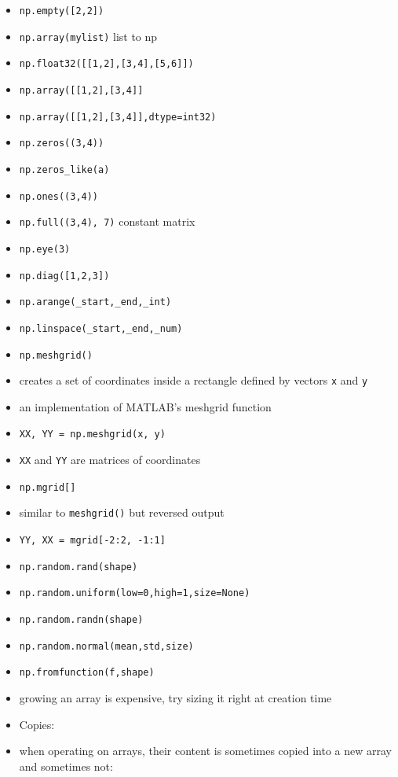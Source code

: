 \documentclass[onecolumn]{IEEEtran} %
\begin{document}
\begin{itemize}
    \bi
        \item \verb|np.empty([2,2])|
        \item \verb|np.array(mylist)| list to np
        \item \verb|np.float32([[1,2],[3,4],[5,6]])|
        \item \verb|np.array([[1,2],[3,4]]|
        \item \verb|np.array([[1,2],[3,4]],dtype=int32)|
        \item \verb|np.zeros((3,4))|
        \item \verb|np.zeros_like(a)|
        \item \verb|np.ones((3,4))|
        \item \verb|np.full((3,4), 7)| constant matrix
        \item \verb|np.eye(3)|
        \item \verb|np.diag([1,2,3])|
        \item \verb|np.arange(_start,_end,_int)|
        \item \verb|np.linspace(_start,_end,_num)|
         \item \verb|np.meshgrid()|
        \bi
            \item creates a set of coordinates inside a rectangle defined by vectors \verb|x| and \verb|y|
            \item an implementation of MATLAB's meshgrid function
            \item \verb|XX, YY = np.meshgrid(x, y)|
            \item \verb|XX| and \verb|YY| are matrices of coordinates
        \ei
        \item \verb|np.mgrid[]|
        \bi
            \item similar to \verb|meshgrid()| but reversed output
            \item \verb|YY, XX = mgrid[-2:2, -1:1]|
        \ei
        \item \verb|np.random.rand(shape)|
        \item \verb|np.random.uniform(low=0,high=1,size=None)|
        \item \verb|np.random.randn(shape)|
        \item \verb|np.random.normal(mean,std,size)|
        \item \verb|np.fromfunction(f,shape)|
        \item growing an array is expensive, try sizing it right at creation time
    \ei
    \item Copies:
    \bi
        \item when operating on arrays, their content is sometimes copied into a new array and sometimes not:

\end{itemize}
\end{document}
